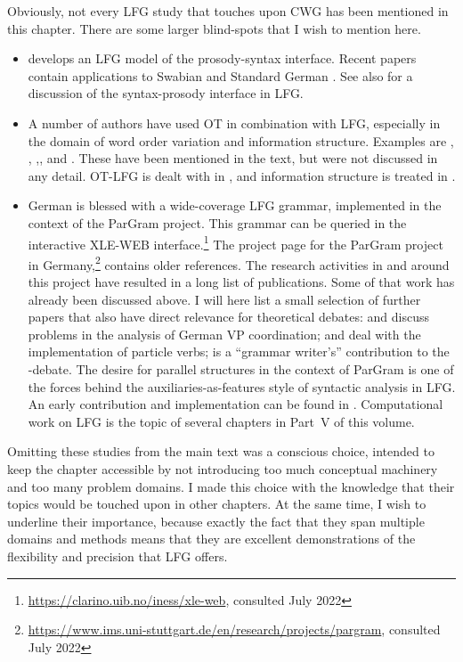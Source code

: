 \documentclass[output=paper,hidelinks]{langscibook}
\begin{document}
Obviously, not every LFG study that touches upon CWG has been
mentioned in this chapter. There are some larger blind-spots that I
wish to mention here.
%
\begin{itemize}
\item \citet{Boegel2015} develops an LFG model of the
  prosody-syntax interface. Recent papers contain applications to
  Swabian \citep{BoegelRaach2020,boegel:2021:languages} and
  Standard German \citep{Boegel2020}. See also  for a 
  discussion of the syntax-prosody interface in LFG.
\item A number of authors have used OT in combination with LFG,
  especially in the domain of word order variation and information
  structure. Examples are
  \citet{Choi1999,Choi2001}, \citet{cook:2001:revdiss}, \citet{CookPayne},, and \citet{seiler:2007}. These
  have been mentioned in the text, but were not discussed in any
  detail. OT-LFG is dealt with in , and information structure is treated in .
\item German is blessed with a wide-coverage LFG grammar,
  implemented in the context of the ParGram project. This grammar can be
  queried in the interactive XLE-WEB interface.\footnote{\url{https://clarino.uib.no/iness/xle-web}, consulted July 2022} The project page for the
  ParGram project in Germany,\footnote{\url{https://www.ims.uni-stuttgart.de/en/research/projects/pargram}, consulted July 2022}
  contains older references. The research activities in and around
  this project have resulted in a long list of publications. Some of
  that work has already been discussed above. I will here list a small
  selection of further papers that also have direct relevance for
  theoretical debates:
  \citet{forst-rohrer:2009:lfg} and \citet{kuhn-etal:2010:lfg} discuss problems in
  the analysis of German VP coordination;
  \citet{rehbein-van-genabith:2006:german} and \citet{forstetal10} deal
  with the implementation of particle verbs; \citet{forst06} is
  a ``grammar writer's'' contribution to the \COMP-debate.  The desire
  for parallel structures in the context of ParGram is one of the
  forces behind the auxiliaries-as-features style of syntactic
  analysis in LFG. An early contribution and implementation can be
  found in \citet{butt-etal1996-coling}. Computational work on LFG is
  the topic of several chapters in Part~V of this volume.
\end{itemize} 
%
Omitting these studies from the main text was a conscious choice, intended to
keep the chapter accessible by not introducing too much conceptual
machinery and too many problem domains. I made this choice with the
knowledge that their topics would be touched upon in other
chapters. At the same time, I wish to underline their importance,
because exactly the fact that they span multiple domains and methods
means that they are excellent demonstrations of the flexibility and
precision that LFG offers.
\end{document}

